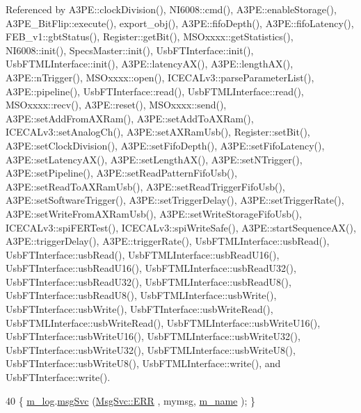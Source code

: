 Referenced by A3\+P\+E\+::clock\+Division(), N\+I6008\+::cmd(), A3\+P\+E\+::enable\+Storage(), A3\+P\+E\+\_\+\+Bit\+Flip\+::execute(), export\+\_\+obj(), A3\+P\+E\+::fifo\+Depth(), A3\+P\+E\+::fifo\+Latency(), F\+E\+B\+\_\+v1\+::gbt\+Status(), Register\+::get\+Bit(), M\+S\+Oxxxx\+::get\+Statistics(), N\+I6008\+::init(), Specs\+Master\+::init(), Usb\+F\+T\+Interface\+::init(), Usb\+F\+T\+M\+L\+Interface\+::init(), A3\+P\+E\+::latency\+A\+X(), A3\+P\+E\+::length\+A\+X(), A3\+P\+E\+::n\+Trigger(), M\+S\+Oxxxx\+::open(), I\+C\+E\+C\+A\+Lv3\+::parse\+Parameter\+List(), A3\+P\+E\+::pipeline(), Usb\+F\+T\+Interface\+::read(), Usb\+F\+T\+M\+L\+Interface\+::read(), M\+S\+Oxxxx\+::recv(), A3\+P\+E\+::reset(), M\+S\+Oxxxx\+::send(), A3\+P\+E\+::set\+Add\+From\+A\+X\+Ram(), A3\+P\+E\+::set\+Add\+To\+A\+X\+Ram(), I\+C\+E\+C\+A\+Lv3\+::set\+Analog\+Ch(), A3\+P\+E\+::set\+A\+X\+Ram\+Usb(), Register\+::set\+Bit(), A3\+P\+E\+::set\+Clock\+Division(), A3\+P\+E\+::set\+Fifo\+Depth(), A3\+P\+E\+::set\+Fifo\+Latency(), A3\+P\+E\+::set\+Latency\+A\+X(), A3\+P\+E\+::set\+Length\+A\+X(), A3\+P\+E\+::set\+N\+Trigger(), A3\+P\+E\+::set\+Pipeline(), A3\+P\+E\+::set\+Read\+Pattern\+Fifo\+Usb(), A3\+P\+E\+::set\+Read\+To\+A\+X\+Ram\+Usb(), A3\+P\+E\+::set\+Read\+Trigger\+Fifo\+Usb(), A3\+P\+E\+::set\+Software\+Trigger(), A3\+P\+E\+::set\+Trigger\+Delay(), A3\+P\+E\+::set\+Trigger\+Rate(), A3\+P\+E\+::set\+Write\+From\+A\+X\+Ram\+Usb(), A3\+P\+E\+::set\+Write\+Storage\+Fifo\+Usb(), I\+C\+E\+C\+A\+Lv3\+::spi\+F\+E\+R\+Test(), I\+C\+E\+C\+A\+Lv3\+::spi\+Write\+Safe(), A3\+P\+E\+::start\+Sequence\+A\+X(), A3\+P\+E\+::trigger\+Delay(), A3\+P\+E\+::trigger\+Rate(), Usb\+F\+T\+M\+L\+Interface\+::usb\+Read(), Usb\+F\+T\+Interface\+::usb\+Read(), Usb\+F\+T\+M\+L\+Interface\+::usb\+Read\+U16(), Usb\+F\+T\+Interface\+::usb\+Read\+U16(), Usb\+F\+T\+M\+L\+Interface\+::usb\+Read\+U32(), Usb\+F\+T\+Interface\+::usb\+Read\+U32(), Usb\+F\+T\+M\+L\+Interface\+::usb\+Read\+U8(), Usb\+F\+T\+Interface\+::usb\+Read\+U8(), Usb\+F\+T\+M\+L\+Interface\+::usb\+Write(), Usb\+F\+T\+Interface\+::usb\+Write(), Usb\+F\+T\+Interface\+::usb\+Write\+Read(), Usb\+F\+T\+M\+L\+Interface\+::usb\+Write\+Read(), Usb\+F\+T\+M\+L\+Interface\+::usb\+Write\+U16(), Usb\+F\+T\+Interface\+::usb\+Write\+U16(), Usb\+F\+T\+M\+L\+Interface\+::usb\+Write\+U32(), Usb\+F\+T\+Interface\+::usb\+Write\+U32(), Usb\+F\+T\+M\+L\+Interface\+::usb\+Write\+U8(), Usb\+F\+T\+Interface\+::usb\+Write\+U8(), Usb\+F\+T\+M\+L\+Interface\+::write(), and Usb\+F\+T\+Interface\+::write().


\begin{DoxyCode}
40 \{ \hyperlink{classObject_a0d269813dd7ac1f24bc143031e2963f2}{m\_log}.\hyperlink{classMsgSvc_ad25f18047920cc59a314e5098259711c}{msgSvc} (\hyperlink{classMsgSvc_ae671eb7301996cd049d2da8a65925926a35a9d7166e9896af4ec8fb33bf5f1772}{MsgSvc::ERR}     , mymsg, \hyperlink{classObject_a8b83c95c705d2c3ba0d081fe1710f48d}{m\_name} ); \}
\end{DoxyCode}
\mbox{\label{classObject_ad7f6c457733082efa2f9ff5f5c8e119a}} 
